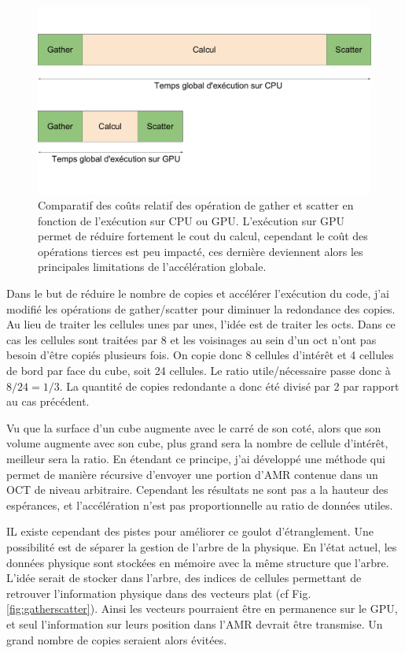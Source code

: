 \begin{figure}
        \includegraphics[width=.95\linewidth]{img/02/gsCPUGPU.pdf} 
        \caption[Comparatif coût CPU et GPU]{Comparatif des coûts relatif des opération de gather et scatter en fonction de l'exécution sur CPU ou GPU.
        L'exécution sur GPU permet de réduire fortement le cout du calcul, cependant le coût des opérations tierces est peu impacté, ces dernière deviennent alors les principales limitations de l'accélération globale.
 		\label{fig:fracgatherscatter}
 		}
\end{figure}


Dans le but de réduire le nombre de copies et accélérer l'exécution du code, j'ai modifié les opérations de gather/scatter pour diminuer la redondance des copies.
Au lieu de traiter les cellules unes par unes, l'idée est de traiter les octs.
Dans ce cas les cellules sont traitées par 8 et les voisinages au sein d'un oct n'ont pas besoin d'être copiés plusieurs fois.
On copie donc 8 cellules d'intérêt et 4 cellules de bord par face du cube, soit 24 cellules.
Le ratio utile/nécessaire passe donc à $8/24 = 1/3$.
La quantité de copies redondante a donc été divisé par 2 par rapport au cas précédent.

Vu que la surface d'un cube augmente avec le carré de son coté, alors que son volume augmente avec son cube, plus grand sera la nombre de cellule d'intérêt, meilleur sera la ratio.
En étendant ce principe, j'ai développé une méthode qui permet de manière récursive d'envoyer une portion d'\ac{AMR} contenue dans un OCT de niveau arbitraire.
Cependant les résultats ne sont pas a la hauteur des espérances, et l'accélération n'est pas proportionnelle au ratio de données utiles.

IL existe cependant des pistes pour améliorer ce goulot d'étranglement.
Une possibilité est de séparer la gestion de l'arbre de la physique.
En l'état actuel, les données physique sont stockées en mémoire avec la même structure que l'arbre.
L'idée serait de stocker dans l'arbre, des indices de cellules permettant de retrouver l'information physique dans des vecteurs plat (cf Fig. \ref{fig:gatherscatter}).
Ainsi les vecteurs pourraient être en permanence sur le \ac{GPU}, et seul l'information sur leurs position dans l'AMR devrait être transmise.
Un grand nombre de copies seraient alors évitées. 


